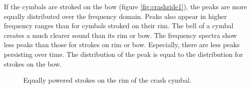 If the cymbals are stroked on the bow (figure \ref{fig:crashride1}), the peaks are more equally distributed over the frequency domain. Peaks also appear in higher frequency ranges than for cymbals stroked on their rim. The bell of a cymbal creates a much clearer sound than its rim or bow. The frequency spectra show less peaks than those for strokes on rim or bow. Especially, there are less peaks persisting over time. The distribution of the peak is equal to the distribution for strokes on the bow.

\begin{figure}[bp]
	\centering
	\qquad
	\caption{Equally powered strokes on the rim of the crash cymbal.}
	\label{fig:crash1}
\end{figure}

